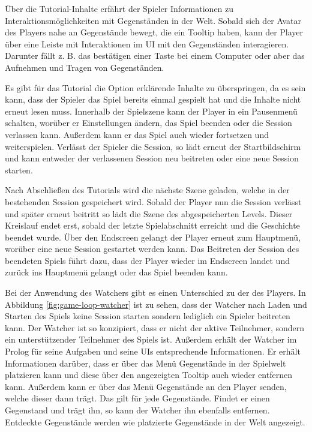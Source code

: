 Über die Tutorial-Inhalte erfährt der Spieler Informationen zu Interaktionsmöglichkeiten mit Gegenständen in der Welt. Sobald sich der Avatar des Players nahe an Gegenstände bewegt, die ein Tooltip haben, kann der Player über eine Leiste mit Interaktionen im UI mit den Gegenständen interagieren. Darunter fällt z. B. das bestätigen einer Taste bei einem Computer oder aber das Aufnehmen und Tragen von Gegenständen.

Es gibt für das Tutorial die Option erklärende Inhalte zu überspringen, da es sein kann, dass der Spieler das Spiel bereits einmal gespielt hat und die Inhalte nicht erneut lesen muss. Innerhalb der Spielszene kann der Player in ein Pausenmenü schalten, worüber er Einstellungen ändern, das Spiel beenden oder die Session verlassen kann. Außerdem kann er das Spiel auch wieder fortsetzen und weiterspielen. Verlässt der Spieler die Session, so lädt erneut der Startbildschirm und kann entweder der verlassenen Session neu beitreten oder eine neue Session starten.

Nach Abschließen des Tutorials wird die nächste Szene geladen, welche in der bestehenden Session gespeichert wird. Sobald der Player nun die Session verlässt und später erneut beitritt so lädt die Szene des abgespeicherten Levels. Dieser Kreislauf endet erst, sobald der letzte Spielabschnitt erreicht und die Geschichte beendet wurde. Über den Endscreen gelangt der Player erneut zum Hauptmenü, worüber eine neue Session gestartet werden kann. Das Beitreten der Session des beendeten Spiels führt dazu, dass der Player wieder im Endscreen landet und zurück ins Hauptmenü gelangt oder das Spiel beenden kann.

Bei der Anwendung des Watchers gibt es einen Unterschied zu der des Players. In Abbildung \ref{fig:game-loop-watcher} ist zu sehen, dass der Watcher nach Laden und Starten des Spiels keine Session starten sondern lediglich ein Spieler beitreten kann. Der Watcher ist so konzipiert, dass er nicht der aktive Teilnehmer, sondern ein unterstützender Teilnehmer des Spiels ist. Außerdem erhält der Watcher im Prolog für seine Aufgaben und seine \ac{UI}s entsprechende Informationen. Er erhält Informationen darüber, dass er über das Menü  Gegenstände in der  Spielwelt platzieren kann und diese über den angezeigten Tooltip auch wieder entfernen kann. Außerdem kann er über das Menü  Gegenstände an den Player senden, welche dieser dann trägt. Das gilt für jede Gegenstände. Findet er einen Gegenstand und trägt ihn, so kann der Watcher ihn ebenfalls entfernen. Entdeckte Gegenstände werden wie platzierte Gegenstände in der Welt angezeigt.

